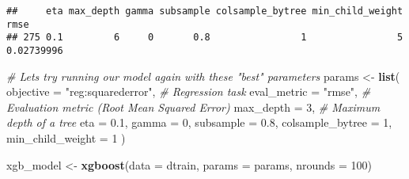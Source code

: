 \documentclass[
]{article}
\newenvironment{Shaded}{\begin{snugshade}}{\end{snugshade}}
\newcommand{\AttributeTok}[1]{\textcolor[rgb]{0.13,0.29,0.53}{#1}}
\newcommand{\CommentTok}[1]{\textcolor[rgb]{0.56,0.35,0.01}{\textit{#1}}}
\newcommand{\DecValTok}[1]{\textcolor[rgb]{0.00,0.00,0.81}{#1}}
\newcommand{\FloatTok}[1]{\textcolor[rgb]{0.00,0.00,0.81}{#1}}
\newcommand{\FunctionTok}[1]{\textcolor[rgb]{0.13,0.29,0.53}{\textbf{#1}}}
\newcommand{\NormalTok}[1]{#1}
\newcommand{\OtherTok}[1]{\textcolor[rgb]{0.56,0.35,0.01}{#1}}
\newcommand{\StringTok}[1]{\textcolor[rgb]{0.31,0.60,0.02}{#1}}
\begin{document}
\begin{verbatim}
##     eta max_depth gamma subsample colsample_bytree min_child_weight       rmse
## 275 0.1         6     0       0.8                1                5 0.02739996
\end{verbatim}

\begin{Shaded}
\begin{Highlighting}[]
\CommentTok{\# Let\textquotesingle{}s try running our model again with these "best" parameters}
\NormalTok{params }\OtherTok{\textless{}{-}} \FunctionTok{list}\NormalTok{(}
  \AttributeTok{objective =} \StringTok{"reg:squarederror"}\NormalTok{,  }\CommentTok{\# Regression task}
  \AttributeTok{eval\_metric =} \StringTok{"rmse"}\NormalTok{,            }\CommentTok{\# Evaluation metric (Root Mean Squared Error)}
  \AttributeTok{max\_depth =} \DecValTok{3}\NormalTok{,                 }\CommentTok{\# Maximum depth of a tree}
  \AttributeTok{eta =} \FloatTok{0.1}\NormalTok{,     }
  \AttributeTok{gamma =} \DecValTok{0}\NormalTok{,}
  \AttributeTok{subsample =} \FloatTok{0.8}\NormalTok{,}
  \AttributeTok{colsample\_bytree =} \DecValTok{1}\NormalTok{,}
  \AttributeTok{min\_child\_weight =} \DecValTok{1}
\NormalTok{)}

\NormalTok{xgb\_model }\OtherTok{\textless{}{-}} \FunctionTok{xgboost}\NormalTok{(}\AttributeTok{data =}\NormalTok{ dtrain, }\AttributeTok{params =}\NormalTok{ params, }\AttributeTok{nrounds =} \DecValTok{100}\NormalTok{)}
\end{Highlighting}
\end{Shaded}
\end{document}
